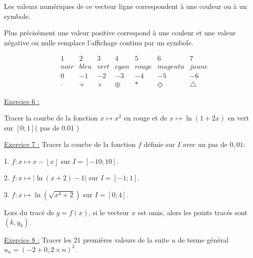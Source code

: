 \documentclass{article}
\begin{document}
Les valeurs num\'{e}riques de ce vecteur ligne correspondent \`{a} une
couleur ou \`{a} un symbole.

Plus pr\'{e}cis\'{e}ment une valeur positive correspond \`{a} une couleur et
une valeur n\'{e}gative ou nulle remplace l'affichage continu par un symbole.

$\ \ \ \ \ \ \ \ \ \ \ \ \ \ \ \ \ \ \ \ \ \ \ \ \ \ \ \ \ \ \ \ \ \ \ 
\begin{array}{ccccccc}
1 & 2 & 3 & 4 & 5 & 6 & 7 \\ 
noir & bleu & vert & cyan & rouge & magenta & jaune \\ 
0 & -1 & -2 & -3 & -4 & -5 & -6 \\ 
\cdot & + & \times & \oplus & \ast & \Diamond & \bigtriangleup%
\end{array}%
$

\underline{Exercice 6 :}

Tracer la courbe de la fonction $x\mapsto x^{2}$ en rouge et de $x\mapsto
\ln (1+2x)$ en vert sur $\left[ 0;1\right] $( pas de 0.01 )

\underline{Exercice 7 :} Tracer la courbe de la fonction $f$ d\'{e}finie sur 
$I$ avec un pas de $0,01:$

1. $f:x\mapsto x-\left\lfloor x\right\rfloor $ sur $I=\left[ -10;10\right] .$

2. $f:x\mapsto \left\vert \ln (x+2)-1\right\vert $ sur $I=\left[ -1;1\right]
.$

3. $f:x\mapsto \ln (\sqrt{x^{4}+2})$ sur $I=\left[ 0;4\right] .$

\bigskip

Lors du trac\'{e} de $y=f(x)$, si le vecteur $x$ est omis, alors les points
trac\'{e}s sont $(k,y_{k}).$

\underline{Exercice 8 :} Tracer les 21 premi\`{e}res valeurs de la suite $u$
de terme g\'{e}n\'{e}ral $u_{n}=(-2+0,2\times n)^{2}.$
\end{document}
